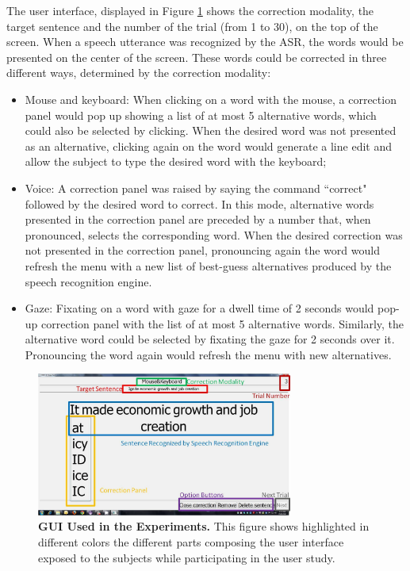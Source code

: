 \documentclass[]{article}
\begin{document}
The user interface, displayed in Figure \ref{guiExampleEdited} shows the correction modality, the target sentence and
the number of the trial (from 1 to 30), on the top of the screen. When a speech utterance was recognized by the ASR, the
words would be presented on the center of the screen. These words could be corrected in three different ways, determined
by the correction modality:
\begin{itemize}
  \item Mouse and keyboard: When clicking on a word with the mouse, a correction panel would pop up showing a list
  of at most 5 alternative words, which could also be selected by clicking. When the desired word was not presented as
  an alternative, clicking again on the word would generate a line edit and allow the subject to type the desired word with the keyboard;
  \item Voice: A correction panel was raised by saying the command ``correct" followed by the
  desired word to correct. In this mode, alternative words presented in the correction panel are preceded by a number that, when pronounced,
  selects the corresponding word. When the desired correction was not presented in the correction panel, pronouncing
  again the word would refresh the menu with a new list of best-guess alternatives produced by the speech recognition engine.
  \item Gaze: Fixating on a word with gaze for a dwell time of 2 seconds would pop-up correction panel with the list of 
  at most 5 alternative words. Similarly, the alternative word could be selected by fixating the gaze for 2 seconds over it.
  Pronouncing the word again would refresh the menu with new alternatives.
\end{itemize}


\begin{figure}[ht]
\begin{center}
\includegraphics[width=0.75\textwidth]{figures/guiExampleEdited.jpg}
\end{center}
\caption{\textbf{GUI Used in the Experiments.} This figure shows highlighted in different colors the different parts 
composing the user interface exposed to the subjects while participating in the user study.}
\label{guiExampleEdited}
\end{figure}
\end{document}
